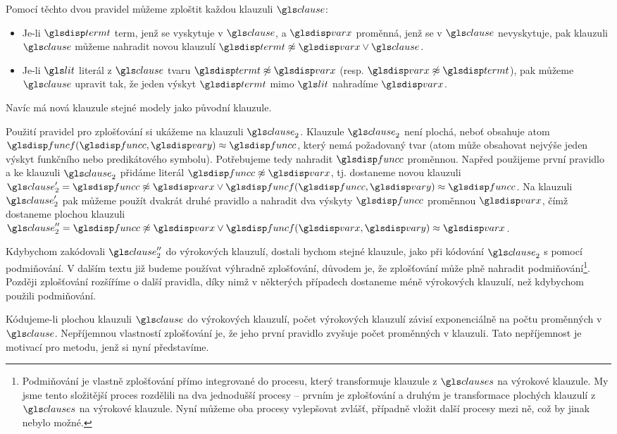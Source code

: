 Pomocí těchto dvou pravidel můžeme zploštit každou
klauzuli $\clause$:
\begin{itemize}
\item Je-li $\term$ term, jenž se vyskytuje v $\clause$, a $\var$ proměnná,
  jenž se v $\clause$ nevyskytuje, pak klauzuli $\clause$ můžeme
  nahradit novou klauzulí $\term \not\approx \var \vee \clause$.
\item Je-li $\lit$ literál z $\clause$ tvaru $\term \not\approx \var$
  (resp. $\var \not\approx \term$),
  pak můžeme $\clause$ upravit tak, že jeden výskyt $\term$
  mimo $\lit$ nahradíme $\var$.
\end{itemize}
Navíc má nová klauzule stejné modely jako původní klauzule.

Použití pravidel pro zplošťování si ukážeme na klauzuli $\clause_2$.
Klauzule $\clause_2$ není plochá, neboť obsahuje atom
$\func(\funcC, \varY) \approx \funcC$, který nemá požadovaný tvar
(atom může obsahovat nejvýše jeden výskyt funkčního nebo predikátového
symbolu). Potřebujeme tedy nahradit $\funcC$ proměnnou.
Napřed použijeme první pravidlo a ke klauzuli $\clause_2$ přidáme literál
$\funcC \not\approx \var$, tj. dostaneme novou klauzuli
$\clause_2' = \funcC \not\approx \var \vee
  \func(\funcC, \varY) \approx \funcC$.
Na klauzuli $\clause_2'$ pak můžeme použít dvakrát druhé pravidlo
a nahradit dva výskyty $\funcC$ proměnnou $\var$, čímž
dostaneme plochou klauzuli
$\clause_2'' = \funcC \not\approx \var \vee
\func(\var, \varY) \approx \var$.

Kdybychom zakódovali
$\clause_2''$ do výrokových klauzulí, dostali bychom stejné klauzule,
jako při kódování $\clause_2$ s pomocí podmiňování.
V dalším textu již budeme používat výhradně zplošťování,
důvodem je, že zplošťování může plně nahradit
podmiňování\footnote{Podmiňování je vlastně zplošťování
přímo integrované do procesu, který transformuje klauzule z $\clauses$
na výrokové klauzule. My jsme tento složitější proces rozdělili na dva
jednodušší procesy -- prvním je zplošťování a druhým je transformace
plochých klauzulí z $\clauses$ na výrokové klauzule. Nyní
můžeme oba procesy vylepšovat zvlášť, případně vložit další procesy mezi
ně, což by jinak nebylo možné.}.
Později zplošťování rozšíříme o další pravidla,
díky nimž v některých případech dostaneme méně výrokových klauzulí,
než kdybychom použili podmiňování.

Kódujeme-li plochou klauzuli $\clause$ do výrokových klauzulí,
počet výrokových klauzulí závisí exponenciálně na počtu proměnných
v $\clause$.
Nepříjemnou vlastností zplošťování je, že jeho první pravidlo
zvyšuje počet proměnných v klauzuli. Tato nepříjemnost je motivací
pro metodu, jenž si nyní představíme.

